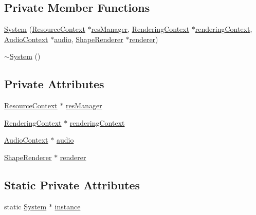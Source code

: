 \subsection*{Private Member Functions}
\begin{DoxyCompactItemize}
\item 
\hyperlink{classZeta_1_1System_a5d071efafa2bc4581217ee803bf437d4}{System} (\hyperlink{classZeta_1_1ResourceContext}{Resource\+Context} $\ast$\hyperlink{classZeta_1_1System_a303ac11860bb3d3739841d28d067a585}{res\+Manager}, \hyperlink{classZeta_1_1RenderingContext}{Rendering\+Context} $\ast$\hyperlink{classZeta_1_1System_ab9e2c432557b97211aa16f7dbe141935}{rendering\+Context}, \hyperlink{classZeta_1_1AudioContext}{Audio\+Context} $\ast$\hyperlink{classZeta_1_1System_a61f585e0dc227e82f965dbdb5537e60c}{audio}, \hyperlink{classZeta_1_1ShapeRenderer}{Shape\+Renderer} $\ast$\hyperlink{classZeta_1_1System_a1be4cf982a5738ac3787ed01faed74ab}{renderer})
\item 
\hyperlink{classZeta_1_1System_ab8cec5a111594ec68990549ff98b66d1}{$\sim$\+System} ()
\end{DoxyCompactItemize}
\subsection*{Private Attributes}
\begin{DoxyCompactItemize}
\item 
\hyperlink{classZeta_1_1ResourceContext}{Resource\+Context} $\ast$ \hyperlink{classZeta_1_1System_a303ac11860bb3d3739841d28d067a585}{res\+Manager}
\item 
\hyperlink{classZeta_1_1RenderingContext}{Rendering\+Context} $\ast$ \hyperlink{classZeta_1_1System_ab9e2c432557b97211aa16f7dbe141935}{rendering\+Context}
\item 
\hyperlink{classZeta_1_1AudioContext}{Audio\+Context} $\ast$ \hyperlink{classZeta_1_1System_a61f585e0dc227e82f965dbdb5537e60c}{audio}
\item 
\hyperlink{classZeta_1_1ShapeRenderer}{Shape\+Renderer} $\ast$ \hyperlink{classZeta_1_1System_a1be4cf982a5738ac3787ed01faed74ab}{renderer}
\end{DoxyCompactItemize}
\subsection*{Static Private Attributes}
\begin{DoxyCompactItemize}
\item 
static \hyperlink{classZeta_1_1System}{System} $\ast$ \hyperlink{classZeta_1_1System_a4b6738bd3000082341fa756ad4b474c5}{instance}
\end{DoxyCompactItemize}


